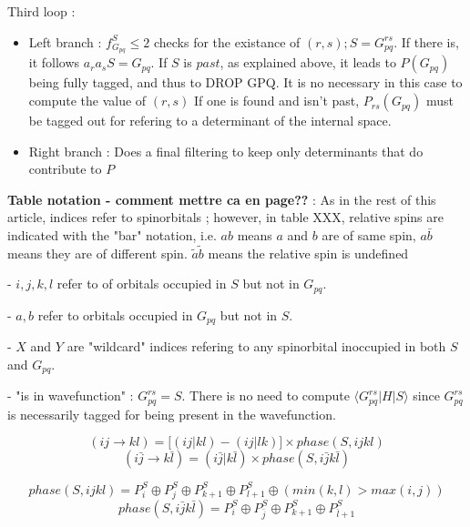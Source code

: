 \documentclass[./thesis.tex]{subfiles}
\begin{document}
Third loop :
\begin{itemize}

\item
Left branch : $f_{G_{pq}}^S \leq 2$ checks for the existance of $(r,s) ;S=G_{pq}^{rs}$. 
If there is, it follows $a_r a_s S = G_{pq}$. If $S$ is $past$, as explained above, it leads to $P(G_{pq})$ being fully tagged, and thus to DROP GPQ. It is no necessary in this case to compute the value of $(r,s)$
If one is found and isn't past, $P_{rs}(G_{pq})$ must be tagged out for refering to a determinant of the internal space.
\item
Right branch :
Does a final filtering to keep only determinants that do contribute to $P$
\end{itemize}



\textbf{Table notation - comment mettre ca en page??} : As in the rest of this article, indices refer to spinorbitals ; however, in table XXX, relative spins are indicated with the "bar" notation, i.e. $ab$ means $a$ and $b$ are of same spin, $a\bar b$ means they are of different spin. $\tilde a \tilde b$ means the relative spin is undefined

- $i,j,k,l$ refer to of orbitals occupied in $S$ but not in $G_{pq}$.

- $a,b$ refer to orbitals occupied in $G_{pq}$ but not in $S$.

- $X$ and $Y$ are "wildcard" indices refering to any spinorbital inoccupied in both $S$ and $G_{pq}$.

- "is in wavefunction" : $G_{pq}^{rs} = S$. There is no need to compute $\langle G_{pq}^{rs}|H|S \rangle$ since $G_{pq}^{rs}$ is necessarily tagged for being present in the wavefunction.


$$(ij \rightarrow kl) = \big [(ij|kl) - (ij|lk) \big ] \times phase(S,ijkl)$$
$$(i\bar j \rightarrow k\bar l) = (i\bar j|k\bar l) \times phase(S,i\bar jk\bar l)$$


$$phase(S,ijkl) = P^S_i \oplus P^S_j \oplus P^S_{k+1} \oplus P^S_{l+1} \oplus (min(k,l)>max(i,j))$$
$$phase(S,i\bar jk\bar l) = P^S_i \oplus P^S_{\bar j} \oplus P^S_{k+1} \oplus P^S_{\bar l+1}$$
\end{document}
